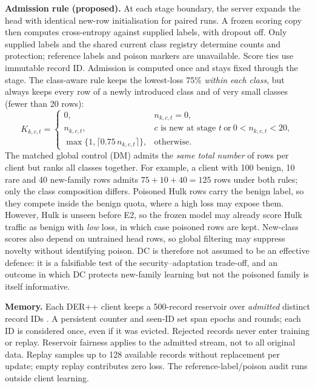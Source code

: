 \documentclass[10pt,a4paper]{article}
\begin{document}
\textbf{Admission rule (proposed).} At each stage boundary, the server expands the head with identical new-row initialisation for paired runs. A frozen scoring copy then computes cross-entropy against supplied labels, with dropout off. Only supplied labels and the shared current class registry determine counts and protection; reference labels and poison markers are unavailable. Score ties use immutable record ID. Admission is computed once and stays fixed through the stage. The class-aware rule keeps the lowest-loss 75\% \emph{within each class}, but always keeps every row of a newly introduced class and of very small classes (fewer than 20 rows):
\begin{equation}
K_{k,c,t}=\begin{cases}
0,&n_{k,c,t}=0,\\
n_{k,c,t},&c\text{ is new at stage }t\ \text{or}\ 0<n_{k,c,t}<20,\\
\max\{1,\lceil 0.75\,n_{k,c,t}\rceil\},&\text{otherwise.}
\end{cases}
\label{eq:quota}
\end{equation}
The matched global control (DM) admits the \emph{same total number} of rows per client but ranks all classes together. For example, a client with 100 benign, 10 rare and 40 new-family rows admits $75+10+40=125$ rows under both rules; only the class composition differs. Poisoned Hulk rows carry the benign label, so they compete inside the benign quota, where a high loss may expose them. However, Hulk is unseen before E2, so the frozen model may already score Hulk traffic as benign with \emph{low} loss, in which case poisoned rows are kept. New-class scores also depend on untrained head rows, so global filtering may suppress novelty without identifying poison. DC is therefore not assumed to be an effective defence: it is a falsifiable test of the security--adaptation trade-off, and an outcome in which DC protects new-family learning but not the poisoned family is itself informative.

\textbf{Memory.} Each DER++ client keeps a 500-record reservoir over \emph{admitted} distinct record IDs \cite{vitter}. A persistent counter and seen-ID set span epochs and rounds; each ID is considered once, even if it was evicted. Rejected records never enter training or replay. Reservoir fairness applies to the admitted stream, not to all original data. Replay samples up to 128 available records without replacement per update; empty replay contributes zero loss. The reference-label/poison audit runs outside client learning.
\end{document}
